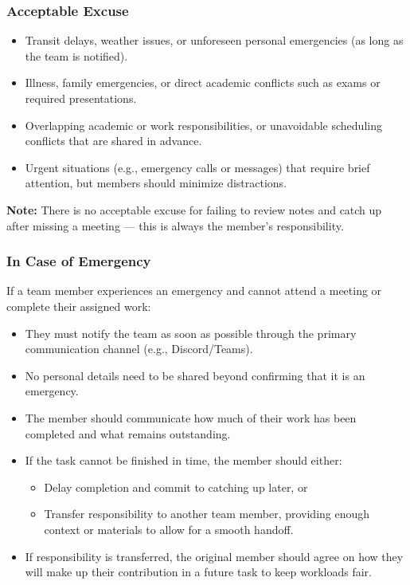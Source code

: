 \documentclass{article}
\begin{document}
\subsubsection*{Acceptable Excuse}

\begin{itemize}
    \item Transit delays, weather issues, or unforeseen personal emergencies (as long as the team is notified).
    \item Illness, family emergencies, or direct academic conflicts such as exams or required presentations.
    \item Overlapping academic or work responsibilities, or unavoidable scheduling conflicts that are shared in advance.
    \item Urgent situations (e.g., emergency calls or messages) that require brief attention, but members should minimize distractions.
\end{itemize}

\textbf{Note:} There is no acceptable excuse for failing to review notes and catch up after missing a meeting — this is always the member’s responsibility.

\subsubsection*{In Case of Emergency}

If a team member experiences an emergency and cannot attend a meeting or complete their assigned work:
\begin{itemize}
    \item They must notify the team as soon as possible through the primary communication channel (e.g., Discord/Teams).
    \item No personal details need to be shared beyond confirming that it is an emergency.
    \item The member should communicate how much of their work has been completed and what remains outstanding.
    \item If the task cannot be finished in time, the member should either:
    \begin{itemize}
        \item Delay completion and commit to catching up later, or
        \item Transfer responsibility to another team member, providing enough context or materials to allow for a smooth handoff.
    \end{itemize}
    \item If responsibility is transferred, the original member should agree on how they will make up their contribution in a future task to keep workloads fair.
\end{itemize}
\end{document}

